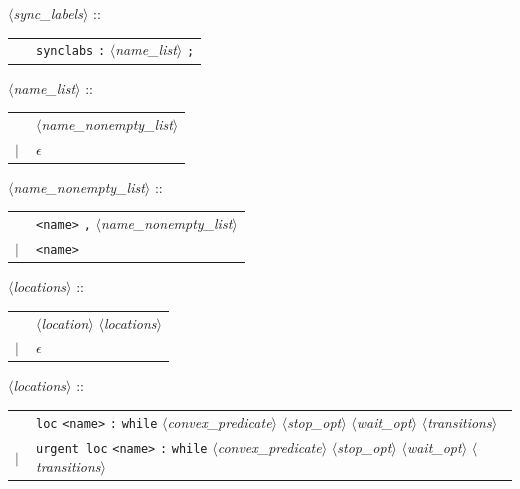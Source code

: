 \documentclass[a4paper,11pt]{report}
\newcommand{\emptystring}{$\epsilon$}
\newcommand{\nt}[1]{$\langle$\emph{#1}$\rangle$}
\newcommand{\regleGrammaire}[1]{\bigskip \noindent \nt{#1} :: \\}
\newcommand{\npec}[1]{\textcolor{green!50!black}{#1}}
\newcommand{\styleIMI}[1]{\textcolor{imicolor}{\texttt{#1}}}
\begin{document}
\regleGrammaire{sync\_labels}
\begin{tabular}{l l}
	\  & \styleIMI{synclabs} \styleIMI{:} \nt{name\_list} \styleIMI{;} \\
\end{tabular}

\regleGrammaire{name\_list}
\begin{tabular}{l l}
	\  & \nt{name\_nonempty\_list} \\
	$|$ & \emptystring \\
\end{tabular}

\regleGrammaire{name\_nonempty\_list}
\begin{tabular}{l l}
	\  & \styleIMI{<name>} \styleIMI{,} \nt{name\_nonempty\_list} \\
	$|$ & \styleIMI{<name>} \\
\end{tabular}

\regleGrammaire{locations}
\begin{tabular}{l l}
	\  & \nt{location} \nt{locations} \\
	$|$ & \emptystring \\
\end{tabular}

\regleGrammaire{locations}
\begin{tabular}{l l}
	\  & \styleIMI{loc} \styleIMI{<name>} \styleIMI{:} \styleIMI{while} \nt{convex\_predicate} \nt{stop\_opt} \npec{\nt{wait\_opt}} \nt{transitions} \\
	$|$ & \styleIMI{urgent loc} \styleIMI{<name>} \styleIMI{:} \styleIMI{while} \nt{convex\_predicate} \nt{stop\_opt} \npec{\nt{wait\_opt}} \nt{transitions} \\
\end{tabular}
\end{document}
